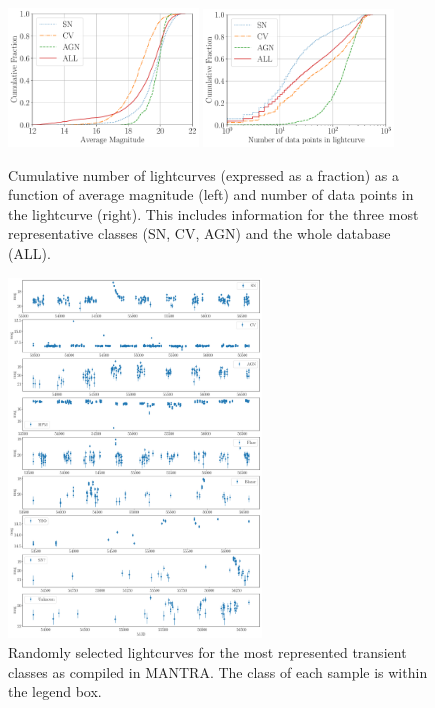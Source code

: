 \documentclass{aastex62}
\begin{document}
\begin{figure}
	\includegraphics[width=0.45\textwidth]{cumulative_magnitude.pdf}
  \includegraphics[width=0.45\textwidth]{cumulative_classes.pdf}
  \caption{Cumulative number of lightcurves (expressed as a fraction)
    as a function of average magnitude (left) and number of data
    points in the lightcurve (right).
    This includes information for the three most representative
    classes (SN, CV, AGN) and the whole database (ALL).}
  \label{fig:cumulative}
\end{figure} 


\begin{figure}
\begin{center}
  \includegraphics[width=0.6\textwidth]{examples_transient.pdf}
\end{center}
  \caption{Randomly selected lightcurves for the most represented transient classes as compiled in MANTRA. The class of each sample is within the legend box. }  
  \label{fig:examples_transient}
\end{figure} 
\end{document}
